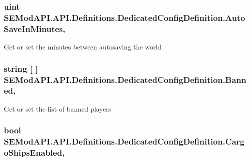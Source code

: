 \subsubsection[{Auto\+Save\+In\+Minutes}]{\setlength{\rightskip}{0pt plus 5cm}uint S\+E\+Mod\+A\+P\+I.\+A\+P\+I.\+Definitions.\+Dedicated\+Config\+Definition.\+Auto\+Save\+In\+Minutes\hspace{0.3cm}{\ttfamily [get]}, {\ttfamily [set]}}\label{class_s_e_mod_a_p_i_1_1_a_p_i_1_1_definitions_1_1_dedicated_config_definition_aa8cf3384611ca01dabbedd7a0944eb29}


Get or set the minutes between autosaving the world 

\hypertarget{class_s_e_mod_a_p_i_1_1_a_p_i_1_1_definitions_1_1_dedicated_config_definition_a714a0afcb6eb7860429373ae700fb5e6}{}
\subsubsection[{Banned}]{\setlength{\rightskip}{0pt plus 5cm}string \mbox{[} \mbox{]} S\+E\+Mod\+A\+P\+I.\+A\+P\+I.\+Definitions.\+Dedicated\+Config\+Definition.\+Banned\hspace{0.3cm}{\ttfamily [get]}, {\ttfamily [set]}}\label{class_s_e_mod_a_p_i_1_1_a_p_i_1_1_definitions_1_1_dedicated_config_definition_a714a0afcb6eb7860429373ae700fb5e6}


Get or set the list of banned players 

\hypertarget{class_s_e_mod_a_p_i_1_1_a_p_i_1_1_definitions_1_1_dedicated_config_definition_acd143bc9b8d728db4e3b0e0998d2de68}{}
\subsubsection[{Cargo\+Ships\+Enabled}]{\setlength{\rightskip}{0pt plus 5cm}bool S\+E\+Mod\+A\+P\+I.\+A\+P\+I.\+Definitions.\+Dedicated\+Config\+Definition.\+Cargo\+Ships\+Enabled\hspace{0.3cm}{\ttfamily [get]}, {\ttfamily [set]}}\label{class_s_e_mod_a_p_i_1_1_a_p_i_1_1_definitions_1_1_dedicated_config_definition_acd143bc9b8d728db4e3b0e0998d2de68}


